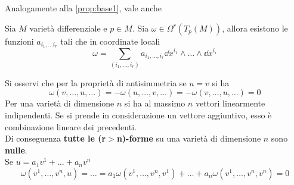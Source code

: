 Analogamente alla \ref{prop:base1}, vale anche
\begin{proposition}\label{prop:base2}
   Sia $M$ varietà differenziale e $p \in M$. Sia $\omega \in \Omega^r(T_p(M))$,
   allora esistono le funzioni $a_{i_1,\dots i_r}$ tali che in coordinate locali\\
   $$
      \omega = \sum_{(i_1,\dots, i_r)} a_{i_1,\dots, i_r}
         \dd x^{i_1} \wedge \dots \wedge \dd x^{i_r}
   $$
\end{proposition}

Si osservi che per la proprietà di antisimmetria se $u = v$ si ha
$$\omega(v,\dots,u,\dots) = - \omega(u,\dots,v,\dots) = - \omega(v,\dots,u,\dots) = 0$$
Per una varietà di dimensione $n$ si ha al massimo $n$ vettori linearmente indipendenti.
Se si prende in considerazione un vettore aggiuntivo, esso è combinazione lineare dei precedenti.\\
Di conseguenza \textbf{tutte le (r$>$n)-forme} su una varietà di dimensione $n$ sono \textbf{nulle}.\\
Se $u= a_1v^1 + \dots + a_nv^n$
$$
   \omega(v^1,\dots,v^n,u) = \dots = a_1\omega(v^1,\dots,v^n,v^1) + \dots
      + a_n\omega(v^1,\dots,v^n,v^n) = 0
$$
